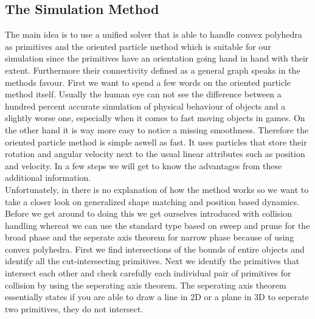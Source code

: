 \documentclass[
	11pt, 
	DIV10,
	a4paper, 
	oneside, 
	headings=normal, 
	captions=tableheading,
	final, 
	numbers=noenddot
]{scrartcl}
\begin{document}
\subsection{The Simulation Method}
	The main idea is to use a unified solver that is able to handle convex polyhedra as primitives and the oriented particle method which is suitable for our simulation since the primitives have an orientation going hand in hand with their extent. Furthermore their connectivity defined as a general graph speaks in the methods favour. First we want to spend a few words on the oriented particle method itself. Usually the human eye can not see the difference between a hundred percent accurate simulation of physical behaviour of objects and a slightly worse one, especially when it comes to fast moving objects in games. On the other hand it is way more easy to notice a missing smoothness. Therefore the oriented particle method is simple aswell as fast. It uses particles that store their rotation and angular velocity next to the usual linear attributes such as position and velocity. In a few steps we will get to know the advantages from these additional information.\\  
	Unfortunately, in \cite{1} there is no explanation of how the method works so we want to take a closer look on generalized shape matching and position based dynamics.\\
	Before we get around to doing this we get ourselves introduced with collision handling whereat we can use the standard type based on sweep and prune for the broad phase and the seperate axis theorem for narrow phase because of using convex polyhedra. First we find intersections of the bounds of entire objects and identify all the cut-intersecting primitives. Next we identify the primitives that intersect each other and check carefully each individual pair of primitives for collision by using the seperating axis theorem. The seperating axis theorem essentially states if you are able to draw a line in 2D or a plane in 3D to seperate two primitives, they do not intersect.
\end{document}
